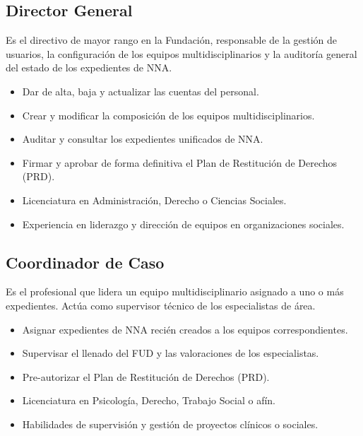\begin{Usuario}{\hypertarget{actDirector}{\subsection{Director General}}}{
		Es el directivo de mayor rango en la Fundación, responsable de la gestión de usuarios, la configuración de los equipos multidisciplinarios y la auditoría general del estado de los expedientes de NNA.
	}
	\item[Responsabilidades:] \cdtEmpty
	\begin{itemize}
		\item Dar de alta, baja y actualizar las cuentas del personal.
		\item Crear y modificar la composición de los equipos multidisciplinarios.
		\item Auditar y consultar los expedientes unificados de NNA.
		\item Firmar y aprobar de forma definitiva el Plan de Restitución de Derechos (PRD).
	\end{itemize}
	\item[Perfil:] \cdtEmpty
	\begin{itemize}
		\item Licenciatura en Administración, Derecho o Ciencias Sociales.
		\item Experiencia en liderazgo y dirección de equipos en organizaciones sociales.
	\end{itemize}
\end{Usuario}

\begin{Usuario}{\hypertarget{actCoordinador}{\subsection{Coordinador de Caso}}}{
		Es el profesional que lidera un equipo multidisciplinario asignado a uno o más expedientes. Actúa como supervisor técnico de los especialistas de área.
	}
	\item[Responsabilidades:] \cdtEmpty
	\begin{itemize}
		\item Asignar expedientes de NNA recién creados a los equipos correspondientes.
		\item Supervisar el llenado del FUD y las valoraciones de los especialistas.
		\item Pre-autorizar el Plan de Restitución de Derechos (PRD).
	\end{itemize}
	\item[Perfil:] \cdtEmpty
	\begin{itemize}
		\item Licenciatura en Psicología, Derecho, Trabajo Social o afín.
		\item Habilidades de supervisión y gestión de proyectos clínicos o sociales.
	\end{itemize}
\end{Usuario}

